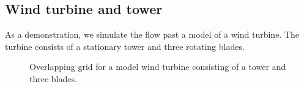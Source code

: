 \subsection{Wind turbine and tower}\label{sec:windTurbineAndTower}

As a demonstration, we simulate the flow past a model of a wind turbine. The turbine consists
of a stationary tower and three rotating blades.


{%
% 
{
\newcommand{\figWidtha}{6.0cm}
\newcommand{\trimfiga}[2]{\trimPlotb{#1}{#2}{.0}{.0}{.05}{.1}}
% 
\newcommand{\figWidthb}{5.5cm}
\newcommand{\trimfigb}[2]{\trimPlotb{#1}{#2}{.15}{.15}{.05}{.0}}
\newcommand{\figWidthc}{6cm}
\newcommand{\trimfigc}[2]{\trimPlotb{#1}{#2}{.1}{.1}{.0}{.05}}
\begin{figure}[hbt]
\begin{center}
\end{center}
 \caption{Overlapping grid for a model wind turbine consisting of a tower and three blades. }
  \label{fig:turbineAndTowerGrid}
\end{figure}
%
}%



}
